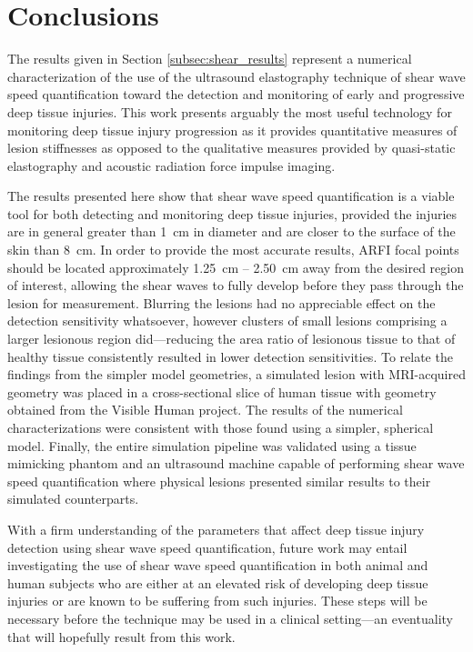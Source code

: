 	\section{Conclusions}
		The results given in Section \ref{subsec:shear_results} represent a numerical characterization of the use of the ultrasound elastography technique of shear wave speed quantification toward the detection and monitoring of early and progressive deep tissue injuries. This work presents arguably the most useful technology for monitoring deep tissue injury progression as it provides quantitative measures of lesion stiffnesses as opposed to the qualitative measures provided by quasi-static elastography and acoustic radiation force impulse imaging.

		The results presented here show that shear wave speed quantification is a viable tool for both detecting and monitoring deep tissue injuries, provided the injuries are in general greater than \SI{1}{\cm} in diameter and are closer to the surface of the skin than \SI{8}{\cm}. In order to provide the most accurate results, ARFI focal points should be located approximately \SI{1.25}{\cm} -- \SI{2.50}{\cm} away from the desired region of interest, allowing the shear waves to fully develop before they pass through the lesion for measurement. Blurring the lesions had no appreciable effect on the detection sensitivity whatsoever, however clusters of small lesions comprising a larger lesionous region did---reducing the area ratio of lesionous tissue to that of healthy tissue consistently resulted in lower detection sensitivities. To relate the findings from the simpler model geometries, a simulated lesion with MRI-acquired geometry was placed in a cross-sectional slice of human tissue with geometry obtained from the Visible Human project. The results of the numerical characterizations were consistent with those found using a simpler, spherical model. Finally, the entire simulation pipeline was validated using a tissue mimicking phantom and an ultrasound machine capable of performing shear wave speed quantification where physical lesions presented similar results to their simulated counterparts.

		With a firm understanding of the parameters that affect deep tissue injury detection using shear wave speed quantification, future work may entail investigating the use of shear wave speed quantification in both animal and human subjects who are either at an elevated risk of developing deep tissue injuries or are known to be suffering from such injuries. These steps will be necessary before the technique may be used in a clinical setting---an eventuality that will hopefully result from this work.

